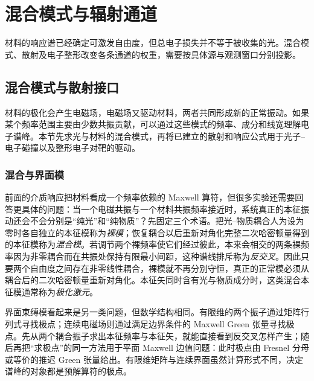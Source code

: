 \chapter{混合模式与辐射通道}\label{chap:hybrid-radiation-channels}

材料的响应谱已经确定可激发自由度，但总电子损失并不等于被收集的光。混合模式、散射及电子整形改变各条通道的权重，需要按具体源与观测窗口分别投影。

\section{混合模式与散射接口}

材料的极化会产生电磁场，电磁场又驱动材料，两者共同形成新的正常振动。如果某个频率范围主要由少数共振贡献，可以通过这些模式的频率、成分和线宽理解电子谱峰。本节先求光与材料的混合模式，再将已建立的散射和响应公式用于光子--电子碰撞以及整形电子对靶的驱动。

\subsection{混合与界面模}

前面的介质响应把材料看成一个频率依赖的 Maxwell 算符，但很多实验还需要回答更具体的问题：当一个电磁共振与一个材料共振频率接近时，系统真正的本征振动还会不会分别是“纯光”和“纯物质”？先固定三个术语。把光--物质耦合人为设为零时各自独立的本征模称为\emph{裸模}；恢复耦合以后重新对角化完整二次哈密顿量得到的本征模称为\emph{混合模}。若调节两个裸频率使它们经过彼此，本来会相交的两条裸频率因为非零耦合而在共振处保持有限最小间距，这种谱线排斥称为\emph{反交叉}。因此只要两个自由度之间存在非零线性耦合，裸模就不再分别守恒，真正的正常模必须从耦合后的二次哈密顿量重新对角化。本征矢同时含有光与物质成分时，这类混合本征模通常称为\emph{极化激元}。

界面束缚模看起来是另一类问题，但数学结构相同。有限维的两个振子通过矩阵行列式寻找极点；连续电磁场则通过满足边界条件的 Maxwell Green 张量寻找极点。先从两个耦合振子求出本征频率与本征矢，就能直接看到反交叉怎样产生；随后再把“求极点”的同一方法用于平面 Maxwell 边值问题：此时极点由 Fresnel 分母或等价的推迟 Green 张量给出。有限维矩阵与连续界面虽然计算形式不同，决定谱峰的对象都是预解算符的极点。

